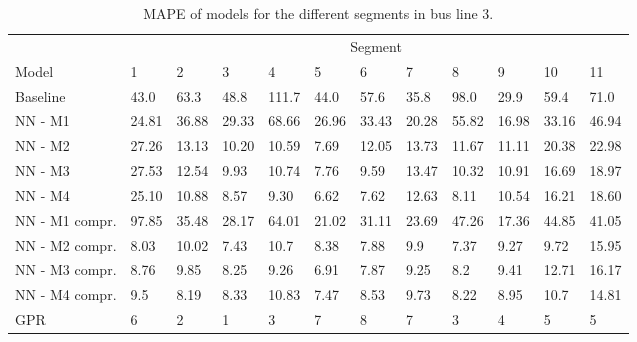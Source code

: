 \begin{table}[H]
  \centering
  \caption{MAPE of models for the different segments in bus line 3.}
  \label{fig:model-mape-of-segs-203}
  \begin{adjustbox}{center}
\begin{tabular}{ l | l | l | l | l | l | l | l | l | l | l | l }
	& \multicolumn{11}{c}{Segment} \\
	Model       & 1 & 2 & 3 & 4 & 5 & 6 & 7 & 8 & 9 & 10 & 11 \\
	\hline
	Baseline  & 43.0 & 63.3 & 48.8 & 111.7 & 44.0 & 57.6 & 35.8 & 98.0 & 29.9 & 59.4  & 71.0 \\
	NN - M1         & 24.81& 36.88& 29.33& 68.66& 26.96& 33.43& 20.28& 55.82& 16.98& 33.16& 46.94 \\
    	NN - M2         & 27.26 & 13.13 & 10.20 & 10.59 &  7.69 & 12.05 &  13.73 & 11.67 & 11.11 & 20.38  & 22.98\\
    	NN - M3         & 27.53 & 12.54 & 9.93 & 10.74 &  7.76 & 9.59 &  13.47 & 10.32 & 10.91 & 16.69  & 18.97\\
    	NN - M4         & 25.10 & 10.88 & 8.57 & 9.30 &  6.62 & 7.62 &  12.63 & 8.11 & 10.54 & 16.21  & 18.60\\
    	NN - M1 compr.         & 97.85& 35.48& 28.17& 64.01& 21.02& 31.11& 23.69& 47.26& 17.36& 44.85& 41.05 \\ 
    	NN - M2 compr.         & 8.03& 10.02& 7.43& 10.7& 8.38& 7.88& 9.9& 7.37& 9.27& 9.72& 15.95 \\
    	NN - M3 compr.         & 8.76& 9.85& 8.25& 9.26& 6.91& 7.87& 9.25& 8.2& 9.41& 12.71& 16.17 \\
    	NN - M4 compr.         & 9.5& 8.19& 8.33& 10.83& 7.47& 8.53& 9.73& 8.22& 8.95& 10.7& 14.81 \\
	GPR         & 6 & 2 & 1 & 3 &  7 & 8 &  7 & 3 & 4 & 5  & 5 \\
\end{tabular}
\end{adjustbox}
\end{table}

